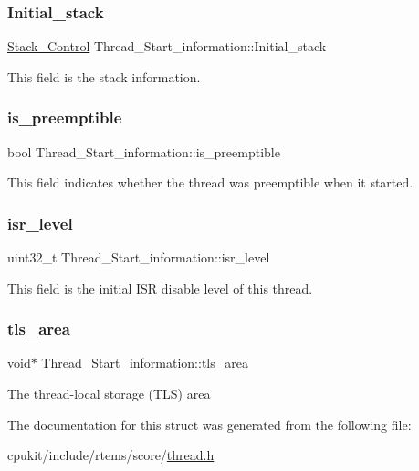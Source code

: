 \subsubsection{\texorpdfstring{Initial\_stack}{Initial\_stack}}
{\footnotesize\ttfamily \mbox{\hyperlink{structStack__Control}{Stack\+\_\+\+Control}} Thread\+\_\+\+Start\+\_\+information\+::\+Initial\+\_\+stack}

This field is the stack information. \mbox{\label{structThread__Start__information_a4bb8829e04040e7ee0cd64f09e272b46}} 
\subsubsection{\texorpdfstring{is\_preemptible}{is\_preemptible}}
{\footnotesize\ttfamily bool Thread\+\_\+\+Start\+\_\+information\+::is\+\_\+preemptible}

This field indicates whether the thread was preemptible when it started. \mbox{\label{structThread__Start__information_a979a1eefc316d3daa85a7ee030eacf08}} 
\subsubsection{\texorpdfstring{isr\_level}{isr\_level}}
{\footnotesize\ttfamily uint32\+\_\+t Thread\+\_\+\+Start\+\_\+information\+::isr\+\_\+level}

This field is the initial I\+SR disable level of this thread. \mbox{\label{structThread__Start__information_a7692b5498bfcad18439b10b4a4baa8d2}} 
\subsubsection{\texorpdfstring{tls\_area}{tls\_area}}
{\footnotesize\ttfamily void$\ast$ Thread\+\_\+\+Start\+\_\+information\+::tls\+\_\+area}

The thread-\/local storage (T\+LS) area 

The documentation for this struct was generated from the following file\+:\begin{DoxyCompactItemize}
\item 
cpukit/include/rtems/score/\mbox{\hyperlink{score_2thread_8h}{thread.\+h}}\end{DoxyCompactItemize}
